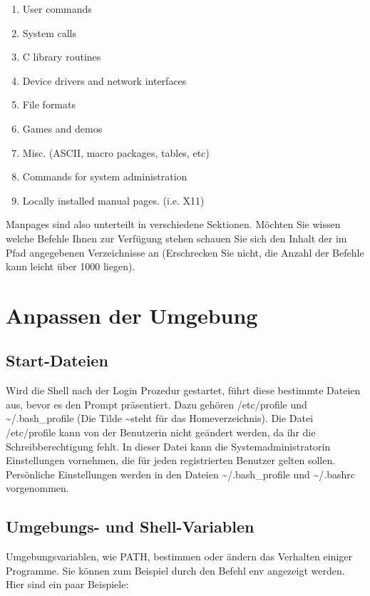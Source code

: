 \documentclass[titlepage,a4paper]{article}
\begin{document}
\begin{enumerate}
\setlength{\itemsep}{0pt}
\item User commands
\item System calls
\item C library routines
\item Device drivers and network interfaces
\item File formats
\item Games and demos
\item Misc. (ASCII, macro packages, tables, etc)
\item Commands for system administration
\item Locally installed manual pages. (i.e. X11)
\end{enumerate}

Manpages sind also unterteilt in verschiedene Sektionen.  Möchten Sie wissen
welche Befehle Ihnen zur Verfügung stehen schauen Sie sich den Inhalt der im
Pfad angegebenen Verzeichnisse an (Erschrecken Sie nicht, die Anzahl der
Befehle kann leicht über 1000 liegen).

\section{Anpassen der Umgebung}

\subsection{Start-Dateien}

Wird die Shell nach der Login Prozedur gestartet, führt diese bestimmte
Dateien aus, bevor es den Prompt präsentiert.  Dazu gehören /etc/profile und
\textasciitilde/.bash\_profile (Die Tilde \textasciitilde steht für das Homeverzeichnis).
Die Datei /etc/profile kann von der Benutzerin nicht geändert werden, da ihr
die Schreibberechtigung fehlt.  In dieser Datei kann die Systemadministratorin
Einstellungen vornehmen, die für jeden registrierten Benutzer gelten sollen.
Persönliche Einstellungen werden in den Dateien \textasciitilde/.bash\_profile
und \textasciitilde/.bashrc vorgenommen.   

\subsection{Umgebungs- und Shell-Variablen}

Umgebungsvariablen, wie PATH, bestimmen oder ändern das Verhalten einiger
Programme.  Sie können zum Beispiel durch den Befehl env
angezeigt werden.  Hier sind ein paar Beispiele:
\end{document}
